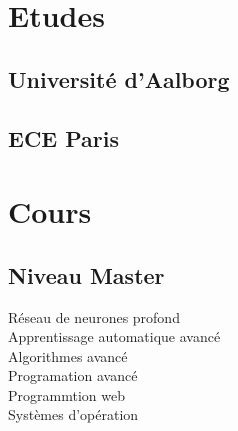 \documentclass[letterpaper]{deedy-resume} %
\begin{document}
\begin{minipage}[t]{0.33\textwidth} %


\section{Etudes} 

\subsection{Université d'Aalborg}


\sectionspace %

\subsection{ECE Paris}




\sectionspace %


\section{Cours}

\subsection{Niveau Master}

Réseau de neurones profond \\
Apprentissage automatique avancé \\
Algorithmes avancé \\
Programation avancé \\
Programmtion web \\
Systèmes d'opération \\

\sectionspace %



\end{minipage}
\end{document}
